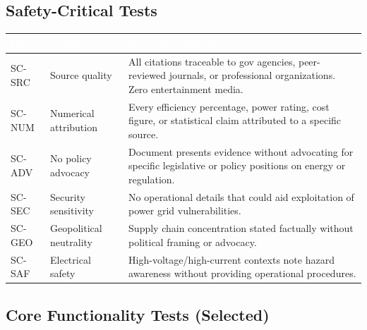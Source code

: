 \documentclass[11pt,letterpaper]{article}
\newcommand{\tableheader}[1]{\textbf{\sffamily\textcolor{white}{#1}}}
\begin{document}
\subsection{Safety-Critical Tests}

\begin{center}
\begin{tabularx}{\textwidth}{C{1.2cm}L{3cm}X}
\toprule
{}
\tableheader{ID} & \tableheader{Verifies} & \tableheader{Expected Behavior} \\
\midrule
SC-SRC & Source quality & All citations traceable to gov agencies, peer-reviewed journals, or professional organizations. Zero entertainment media. \\
SC-NUM & Numerical attribution & Every efficiency percentage, power rating, cost figure, or statistical claim attributed to a specific source. \\
SC-ADV & No policy advocacy & Document presents evidence without advocating for specific legislative or policy positions on energy or regulation. \\
SC-SEC & Security sensitivity & No operational details that could aid exploitation of power grid vulnerabilities. \\
SC-GEO & Geopolitical neutrality & Supply chain concentration stated factually without political framing or advocacy. \\
SC-SAF & Electrical safety & High-voltage/high-current contexts note hazard awareness without providing operational procedures. \\
\bottomrule
\end{tabularx}
\end{center}

\subsection{Core Functionality Tests (Selected)}
\end{document}
